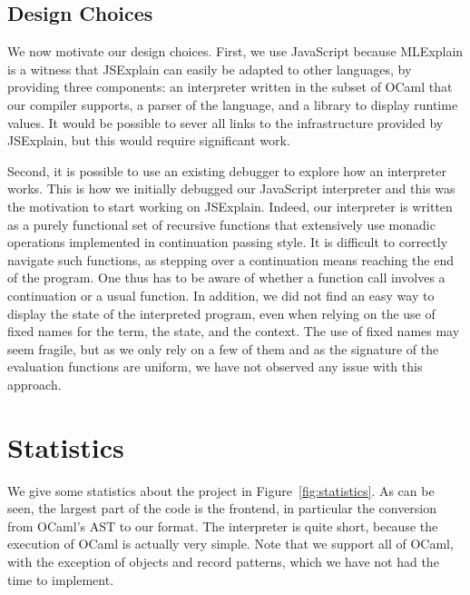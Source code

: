 \documentclass[twocolumn,a4paper]{article} \usepackage[utf8]{inputenc}
\begin{document}
\subsection{Design Choices}\label{subsec:design}

We now motivate our design choices. First, we use JavaScript because MLExplain
is a witness that JSExplain can easily be adapted to other languages, by
providing three components: an interpreter written in the subset of OCaml that
our compiler supports, a parser of the language, and a library to display
runtime values. It would be possible to sever all links to the infrastructure
provided by JSExplain, but this would require significant work.

Second, it is possible to use an existing debugger to explore how an interpreter
works. This is how we initially debugged our JavaScript interpreter and this was
the motivation to start working on JSExplain. Indeed, our interpreter is written
as a purely functional set of recursive functions that extensively use monadic
operations implemented in continuation passing style. It is difficult to
correctly navigate such functions, as stepping over a continuation means
reaching the end of the program. One thus has to be aware of whether a function
call involves a continuation or a usual function. In addition, we did not find
an easy way to display the state of the interpreted program, even when relying
on the use of fixed names for the term, the state, and the context. The use of
fixed names may seem fragile, but as we only rely on a few of them and as the
signature of the evaluation functions are uniform, we have not observed any
issue with this approach.

\section{Statistics}

We give some statistics about the project in Figure~\ref{fig:statistics}. As can
be seen, the largest part of the code is the frontend, in particular the
conversion from OCaml's AST to our format. The interpreter is quite short,
because the execution of OCaml is actually very simple. Note that we support all
of OCaml, with the exception of objects and record patterns, which we have not
had the time to implement.
\end{document}
